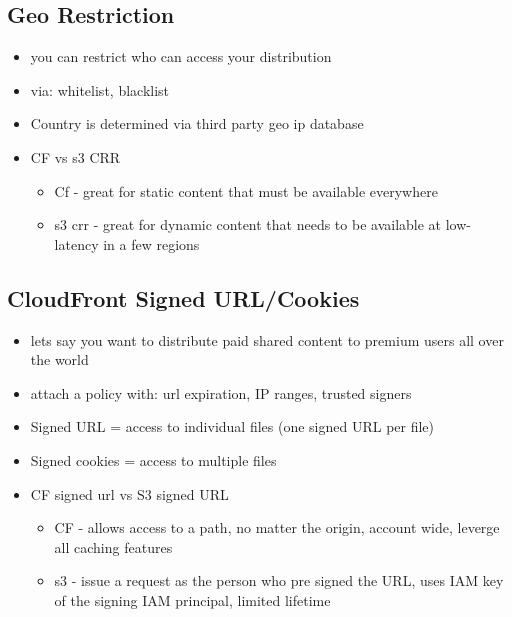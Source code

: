 \documentclass[]{scrartcl}
\begin{document}
\subsection{Geo Restriction}
\begin{itemize}
	\item you can restrict who can access your distribution
	\item via: whitelist, blacklist
	\item Country is determined via third party geo ip database
	\item CF vs s3 CRR
	\begin{itemize}
		\item Cf - great for static content that must be available everywhere
		\item s3 crr - great for dynamic content that needs to be available at low-latency in a few regions
	\end{itemize}
\end{itemize}

\subsection{CloudFront Signed URL/Cookies}
\begin{itemize}
	\item lets say you want to distribute paid shared content to premium users all over the world
	\item attach a policy with: url expiration, IP ranges, trusted signers
	\item Signed URL = access to individual files (one signed URL per file)
	\item Signed cookies = access to multiple files
	\item CF signed url vs S3 signed URL
	\begin{itemize}
		\item CF - allows access to a path, no matter the origin, account wide, leverge all caching features
		\item s3 - issue a request as the person who pre signed the URL, uses IAM key of the signing IAM principal, limited lifetime
	\end{itemize}
\end{itemize}
\end{document}
